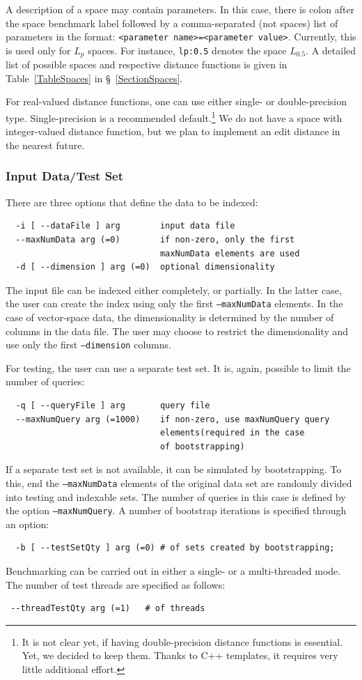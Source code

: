 \documentclass[runningheads,a4paper]{llncs}
\newcommand{\ttt}[1]{\texttt{#1}}
\begin{document}
{A description of a space may contain parameters.
In this case, there is colon after the space benchmark label followed by a
comma-separated (not spaces) list of parameters in the format:
\ttt{<parameter name>=<parameter value>}.
Currently, this is used only for $L_p$ spaces. For instance,
 \ttt{lp:0.5} denotes the space $L_{0.5}$.
A detailed list of possible spaces and respective
distance functions is given in Table~\ref{TableSpaces} in \S~\ref{SectionSpaces}.

For real-valued distance functions, one can use either single- or double-precision
type. Single-precision is a recommended default.\footnote{It is not clear yet,
if having double-precision distance functions is essential. Yet, we decided
to keep them. Thanks to C++ templates, it requires very little additional effort.}
We do not have a space with integer-valued distance function, but we
plan to implement an edit distance in the nearest future.

\subsubsection{Input Data/Test Set}
There are three options that define the data to be indexed:
\begin{verbatim}
  -i [ --dataFile ] arg        input data file
  --maxNumData arg (=0)        if non-zero, only the first 
                               maxNumData elements are used
  -d [ --dimension ] arg (=0)  optional dimensionality
\end{verbatim}
The input file can be indexed either completely, or partially.
In the latter case, the user can create the index using only
the first \ttt{--maxNumData} elements.
In the case of vector-space data, the dimensionality is determined
by the number of columns in the data file.
The user may choose to restrict the dimensionality and use only the first 
\ttt{--dimension} columns.

For testing, the user can use a separate test set.
It is, again, possible to limit the number of queries:
\begin{verbatim}
  -q [ --queryFile ] arg       query file
  --maxNumQuery arg (=1000)    if non-zero, use maxNumQuery query 
                               elements(required in the case 
                               of bootstrapping)
\end{verbatim}
If a separate test set is not available, it can be simulated by bootstrapping.
To this, end the \ttt{--maxNumData} elements of the original data set
are randomly divided into testing and indexable sets.
The number of queries in this case is defined by the option \ttt{--maxNumQuery}.
A number of bootstrap iterations is specified through an option:
\begin{verbatim}
  -b [ --testSetQty ] arg (=0) # of sets created by bootstrapping; 
\end{verbatim}
Benchmarking can be carried out in either a single- or a multi-threaded
mode. The number of test threads are specified as follows:
\begin{verbatim}
 --threadTestQty arg (=1)   # of threads
\end{verbatim}

}
\end{document}
